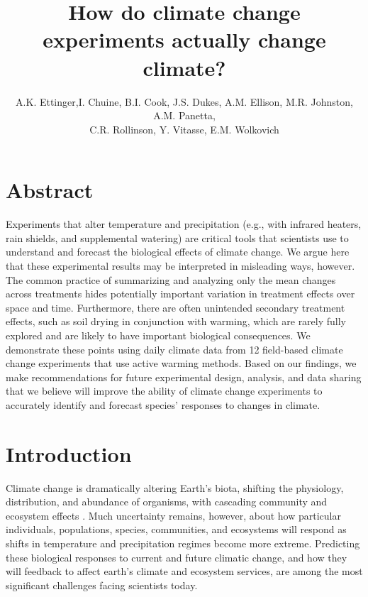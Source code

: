 \documentclass{article}
\begin{document}
 
\title{How do climate change experiments actually change climate?} %
\author{A.K. Ettinger,I. Chuine, B.I. Cook, J.S. Dukes, A.M. Ellison, M.R. Johnston, A.M. Panetta,\\ C.R. Rollinson, Y. Vitasse, E.M. Wolkovich}
\maketitle  %
\section* {Abstract}
\par Experiments that alter temperature and precipitation (e.g., with infrared heaters, rain shields, and supplemental watering) are critical tools that scientists use to understand and forecast the biological effects of climate change. We argue here that these experimental results may be interpreted in misleading ways, however. 
The common practice of summarizing and analyzing only the mean changes across treatments hides potentially important variation in treatment effects over space and time. Furthermore, there are often unintended secondary treatment effects, such as soil drying in conjunction with warming, which are rarely fully explored and are likely to have important biological consequences. We demonstrate these points using daily climate data from 12 field-based climate change experiments that use active warming methods. Based on our findings, we make recommendations for future experimental design, analysis, and data sharing that we believe will improve the ability of climate change experiments to accurately identify and forecast species' responses to changes in climate.
\section* {Introduction}
\par Climate change is dramatically altering Earth's biota, shifting the physiology, distribution, and abundance of organisms, with cascading community and ecosystem effects \citep{shukla1982,cox2000,thomas2004,parmesan2006,field2007,sheldon2011,urban2012}. Much uncertainty remains, however, about how particular individuals, populations, species, communities, and ecosystems will respond as shifts in temperature and precipitation regimes become more extreme. Predicting these biological responses to current and future climatic change, and how they will feedback to affect earth's climate and ecosystem services, are among the most significant challenges facing scientists today.
\end{document}
